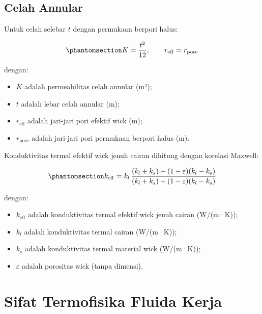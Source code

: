 \documentclass[
  indonesian,
  12pt,
  a4paper,
]{report}
\providecommand{\tightlist}{%
  \setlength{\itemsep}{0pt}\setlength{\parskip}{0pt}}
\begin{document}
\subsection{Celah Annular}\label{celah-annular}

Untuk celah selebar \(t\) dengan permukaan berpori halus:

\begin{equation}\protect\phantomsection\label{eq-annular}{ K = \frac{t^2}{12}, \qquad r_{\mathrm{eff}} = r_{\mathrm{pore}}
   }\end{equation}

dengan:

\begin{itemize}
\tightlist
\item
  \(K\) adalah permeabilitas celah annular (m²);
\item
  \(t\) adalah lebar celah annular (m);
\item
  \(r_{\mathrm{eff}}\) adalah jari-jari pori efektif wick (m);
\item
  \(r_{\mathrm{pore}}\) adalah jari-jari pori permukaan berpori halus
  (m).
\end{itemize}

Konduktivitas termal efektif wick jenuh cairan dihitung dengan korelasi
Maxwell:

\begin{equation}\protect\phantomsection\label{eq-keff}{ k_{\mathrm{eff}} = k_l\,
   \frac{(k_l+k_s)-(1-\varepsilon)(k_l-k_s)}
        {(k_l+k_s)+(1-\varepsilon)(k_l-k_s)} }\end{equation}

dengan:

\begin{itemize}
\tightlist
\item
  \(k_{\mathrm{eff}}\) adalah konduktivitas termal efektif wick jenuh
  cairan (W/(m·K));
\item
  \(k_l\) adalah konduktivitas termal cairan (W/(m·K));
\item
  \(k_s\) adalah konduktivitas termal material wick (W/(m·K));
\item
  \(\varepsilon\) adalah porositas wick (tanpa dimensi).
\end{itemize}

\section{Sifat Termofisika Fluida
Kerja}\label{sifat-termofisika-fluida-kerja}
\end{document}
